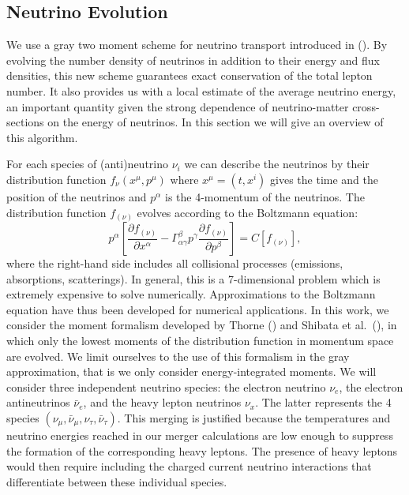 \subsection{Neutrino Evolution}

We use a gray two moment scheme for neutrino transport introduced in (\citet*{foucart2016impact}). By evolving the number density of neutrinos in addition to their energy and flux densities, this new scheme guarantees exact conservation of the total lepton number. It also provides us with a local estimate of the average neutrino energy, an important quantity given the strong dependence of neutrino-matter cross-sections on the energy of neutrinos. In this section we will give an overview of this algorithm.

For each species of (anti)neutrino $\nu_i$ we can describe the neutrinos by their distribution function $f_{\nu}(x^\mu, p^\mu)$ where $x^\mu = (t, x^i)$ gives the time and the position of the neutrinos and $p^\alpha$ is the 4-momentum of the neutrinos. The distribution function $f_{(\nu)}$ evolves according to the Boltzmann equation:
\begin{equation}
  p^\alpha\left[ \frac{\partial f_{(\nu)}}{\partial x^\alpha} - \Gamma^\beta_{\alpha\gamma}p^\gamma\frac{\partial f_{(\nu)}}{\partial p^\beta}\right] = C\left[f_{(\nu)}\right],
\end{equation}
%
where the right-hand side includes all collisional processes (emissions, absorptions, scatterings).
In general, this is a 7-dimensional problem which is extremely expensive to solve numerically. Approximations to the Boltzmann equation have thus been developed for numerical applications. In this work, we consider the moment formalism developed by Thorne (\citet*{1981mnras.194..439t}) and Shibata et al.~(\citet*{shibata:11}), in which only the lowest moments of the distribution function in momentum space are evolved.  We limit ourselves to the use of this formalism in the gray approximation, that is we only consider energy-integrated moments.  We will consider three independent neutrino species: the electron neutrino $\nu_e$, the electron antineutrinos $\bar \nu_e$, and the heavy lepton neutrinos $\nu_x$. The latter represents the 4 species $(\nu_\mu, \bar \nu_\mu, \nu_\tau, \bar \nu_\tau)$. This merging is justified because the temperatures and neutrino energies reached in our merger calculations are low enough to suppress the formation of the corresponding heavy leptons. The presence of heavy leptons would then require including the charged current neutrino interactions that differentiate between these individual species.

